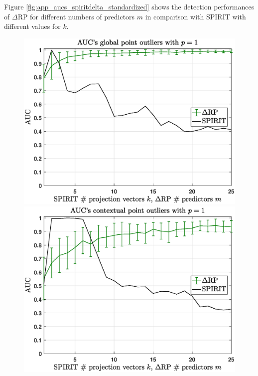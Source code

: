Figure \ref{fig:app_aucs_spiritdelta_standardized} shows the detection performances of $\Delta$RP for different numbers of predictors $m$ in comparison with SPIRIT with different values for $k$. 

\hspace{-0.15cm}
\vspace{-0.2cm}
\begin{figure}[h]
	\hspace{-0.2cm}
	\begin{minipage}{0.333\textwidth}
		\centering
		\includegraphics[scale=0.26]{analysis/AUCs_point_spiritdelta_standardized}
	\end{minipage}
	\begin{minipage}{0.333\textwidth}
		\centering
		\includegraphics[scale=0.26]{analysis/AUCs_contextual_spiritdelta_standardized}

\end{minipage}
\end{figure}
